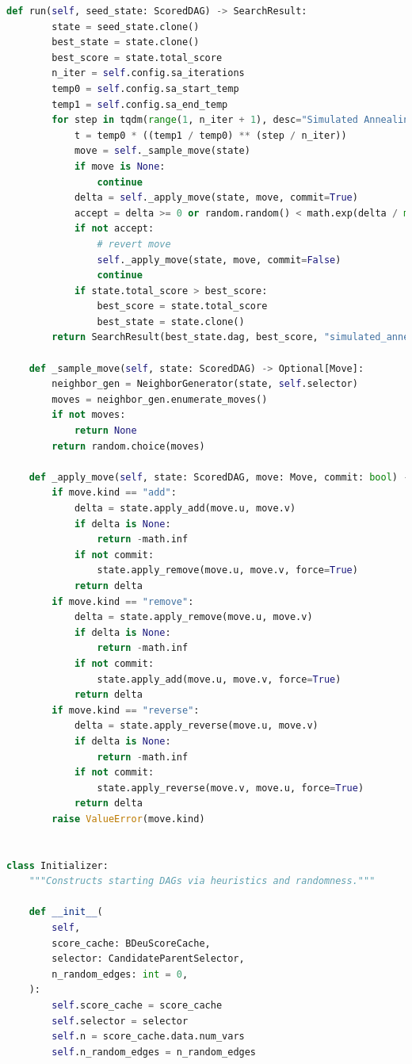 \documentclass[twoside,11pt]{article}
\begin{document}
\begin{algorithm}
\begin{lstlisting}[language=Python]
    def run(self, seed_state: ScoredDAG) -> SearchResult:
        state = seed_state.clone()
        best_state = state.clone()
        best_score = state.total_score
        n_iter = self.config.sa_iterations
        temp0 = self.config.sa_start_temp
        temp1 = self.config.sa_end_temp
        for step in tqdm(range(1, n_iter + 1), desc="Simulated Annealing", unit="iter"):
            t = temp0 * ((temp1 / temp0) ** (step / n_iter))
            move = self._sample_move(state)
            if move is None:
                continue
            delta = self._apply_move(state, move, commit=True)
            accept = delta >= 0 or random.random() < math.exp(delta / max(t, 1e-12))
            if not accept:
                # revert move
                self._apply_move(state, move, commit=False)
                continue
            if state.total_score > best_score:
                best_score = state.total_score
                best_state = state.clone()
        return SearchResult(best_state.dag, best_score, "simulated_annealing", {"iterations": n_iter})

    def _sample_move(self, state: ScoredDAG) -> Optional[Move]:
        neighbor_gen = NeighborGenerator(state, self.selector)
        moves = neighbor_gen.enumerate_moves()
        if not moves:
            return None
        return random.choice(moves)

    def _apply_move(self, state: ScoredDAG, move: Move, commit: bool) -> float:
        if move.kind == "add":
            delta = state.apply_add(move.u, move.v)
            if delta is None:
                return -math.inf
            if not commit:
                state.apply_remove(move.u, move.v, force=True)
            return delta
        if move.kind == "remove":
            delta = state.apply_remove(move.u, move.v)
            if delta is None:
                return -math.inf
            if not commit:
                state.apply_add(move.u, move.v, force=True)
            return delta
        if move.kind == "reverse":
            delta = state.apply_reverse(move.u, move.v)
            if delta is None:
                return -math.inf
            if not commit:
                state.apply_reverse(move.v, move.u, force=True)
            return delta
        raise ValueError(move.kind)


class Initializer:
    """Constructs starting DAGs via heuristics and randomness."""

    def __init__(
        self,
        score_cache: BDeuScoreCache,
        selector: CandidateParentSelector,
        n_random_edges: int = 0,
    ):
        self.score_cache = score_cache
        self.selector = selector
        self.n = score_cache.data.num_vars
        self.n_random_edges = n_random_edges


\end{lstlisting}
\end{algorithm}
\end{document}
